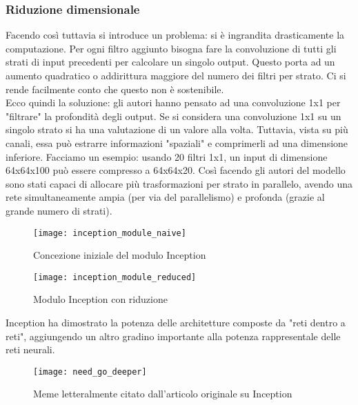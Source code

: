 \subsubsection*{Riduzione dimensionale}
Facendo così tuttavia si introduce un problema: si è ingrandita drasticamente la computazione. Per ogni filtro aggiunto bisogna fare la convoluzione di tutti gli strati di input precedenti per calcolare un singolo output. Questo porta ad un aumento quadratico o addirittura maggiore del numero dei filtri per strato. Ci si rende facilmente conto che questo non è sostenibile.
\medskip
\\Ecco quindi la soluzione: gli autori hanno pensato ad una convoluzione 1x1 per "filtrare" la profondità degli output. Se si considera una convoluzione 1x1 su un singolo strato si ha una valutazione di un valore alla volta. Tuttavia, vista su più \gls{canali}, essa può estrarre informazioni "spaziali" e comprimerli ad una dimensione inferiore. Facciamo un esempio: usando 20 filtri 1x1, un input di dimensione 64x64x100 può essere compresso a 64x64x20. Così facendo gli autori del modello sono stati capaci di allocare più trasformazioni per strato in parallelo, avendo una rete simultaneamente ampia (per via del parallelismo) e profonda (grazie al grande numero di strati).
\begin{figure}[H] 
	\centering
	\texttt{[image: inception\_module\_naive]} 
	\caption{Concezione iniziale del modulo Inception}
	\label{img:inception_module_naive}
\end{figure}
\begin{figure}[H] 
	\centering
	\texttt{[image: inception\_module\_reduced]} 
	\caption{Modulo Inception con riduzione}
	\label{img:inception_module_reduced}
\end{figure}
Inception ha dimostrato la potenza delle architetture composte da "reti dentro a reti", aggiungendo un altro gradino importante alla potenza rappresentale delle reti neurali.
\begin{figure}[H] 
	\centering
	\texttt{[image: need\_go\_deeper]} 
	\caption{Meme letteralmente citato dall'articolo originale su Inception}
	\label{img:need_go_deeper}
\end{figure}

